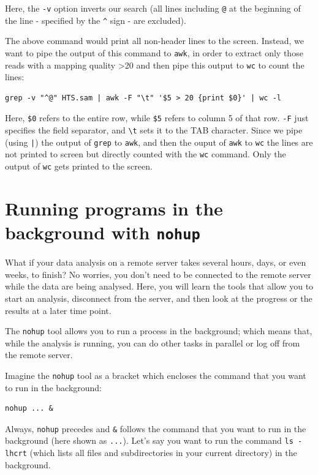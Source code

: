 \documentclass[11pt]{article}
\begin{document}
Here, the \texttt{-v} option inverts our search (all lines including \texttt{@} at
the beginning of the line - specified by the \texttt{\textasciicircum{}} sign - are excluded).

The above command would print all non-header lines to the
screen. Instead, we want to pipe the output of this command to \texttt{awk},
in order to extract only those reads with a mapping quality >20 and
then pipe this output to \texttt{wc} to count the lines:

\begin{verbatim}
grep -v "^@" HTS.sam | awk -F "\t" '$5 > 20 {print $0}' | wc -l
\end{verbatim}

Here, \texttt{\$0} refers to the entire row, while \texttt{\$5} refers to column 5 of
that row. \texttt{-F} just specifies the field separator, and
\texttt{\textbackslash{}t} sets it to the TAB character. Since we pipe (using \texttt{|}) the output of \texttt{grep} to
\texttt{awk}, and then the ouput of \texttt{awk} to \texttt{wc} the lines are not printed to screen but directly
counted with the \texttt{wc} command. Only the output of \texttt{wc} gets printed to the screen.

\section{Running programs in the background with \texttt{nohup}}
\label{sec-5}
What if your data analysis on a remote server takes several hours,
days, or even weeks, to finish? No worries, you don't need to be
connected to the remote server while the data are being
analysed. Here, you will learn the tools that allow you to start
an analysis, disconnect from the server, and then look at the progress
or the results at a later time point.

The \texttt{nohup} tool allows you to run a process in the background; which
means that, while the analysis is running, you can do other tasks in
parallel or log off from the remote server.

Imagine the \texttt{nohup} tool as a bracket which encloses the command that
you want to run in the background:

\begin{verbatim}
nohup ... &
\end{verbatim}

Always, \texttt{nohup} precedes and \texttt{\&} follows the command that you want to
run in the background (here shown as \texttt{...}). Let's say you want to run
the command \texttt{ls -lhcrt} (which lists all files and subdirectories in
your current directory) in the background.
\end{document}
